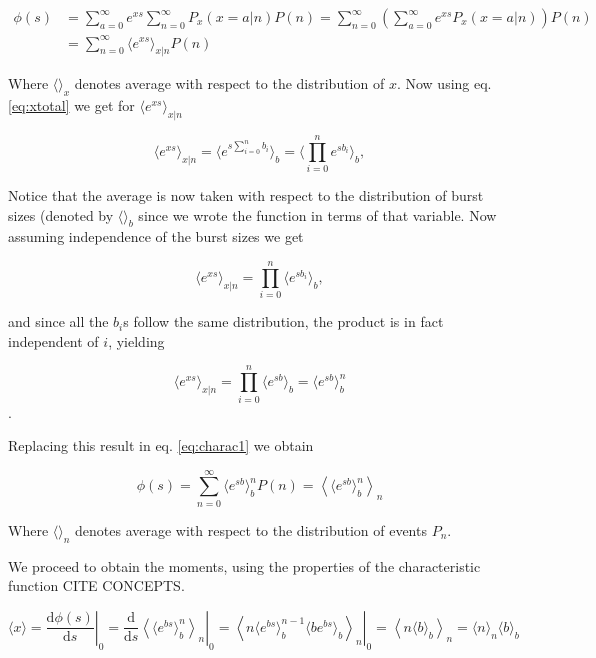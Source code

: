 \begin{equation}
  \label{eq:charac1}
  \begin{split}
    \phi(s) &= \sum_{a=0}^\infty e^{xs}\sum_{n=0}^\infty P_x(x=a|n)P(n) = \sum_{n=0}^\infty\left(\sum_{a=0}^\infty e^{xs}P_x(x=a|n)\right)P(n)\\ 
&= \sum_{n=0}^\infty \langle e^{xs}\rangle_{x|n} P(n)
  \end{split}
\end{equation}

Where $\langle \rangle_x$ denotes average with respect to the distribution of $x$. Now using eq. \ref{eq:xtotal} we get for $\langle e^{xs}\rangle_{x|n}$

\begin{equation*}
  \langle e^{xs}\rangle_{x|n} = \langle e^{s\sum_{i=0}^nb_i} \rangle_b = \langle \prod_{i=0}^ne^{sb_i}\rangle_b,
\end{equation*}

Notice that the average is now taken with respect to the distribution of burst sizes (denoted by $\langle \rangle_b$ since we wrote the function in terms of that variable. Now assuming independence of the burst sizes we get

\begin{equation*}
  \langle e^{xs}\rangle_{x|n} =  \prod_{i=0}^n\langle e^{sb_i}\rangle_b,
\end{equation*}

and since all the $b_i$s follow the same distribution, the product is in fact independent of $i$, yielding

\begin{equation*}
  \langle e^{xs}\rangle_{x|n} = \prod_{i=0}^n\langle e^{sb}\rangle_b = \langle e^{sb}\rangle_b^n
\end{equation*}.

Replacing this result in eq. \ref{eq:charac1} we obtain

\begin{equation}
  \phi(s) = \sum_{n=0}^\infty \langle e^{sb}\rangle_b^n P(n) = \left\langle\langle e^{sb}\rangle_b^n\right\rangle_n
\end{equation}

Where $\langle \rangle_n$ denotes average with respect to the distribution of events $P_n$.

We proceed to obtain the moments, using the properties of the characteristic function CITE CONCEPTS.

\begin{equation}
  \label{eq:avex}
  \langle x\rangle = \left.\frac{\mathrm{d}\phi(s)}{\mathrm{d}s}\right|_0 = \left.\frac{\mathrm{d}}{\mathrm{d}s}\left\langle\langle e^{bs}\rangle_b^n\right\rangle_n\right|_0 = \left.\left\langle n\langle e^{bs}\rangle_b^{n-1}\langle b e^{bs}\rangle_b\right\rangle_n\right|_0 = \left\langle n\langle b\rangle_b\right\rangle_n = \langle n\rangle_n\langle b\rangle_b
\end{equation}

